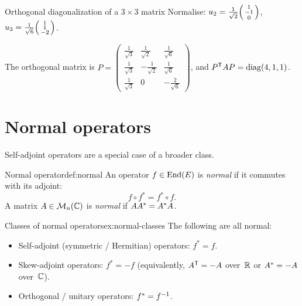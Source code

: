 \begin{example}{Orthogonal diagonalization of a $3\times 3$ matrix}
Normalise:
$u_2 = \frac{1}{\sqrt{2}}\begin{psmallmatrix}1\\-1\\0\end{psmallmatrix}$,
$u_3 = \frac{1}{\sqrt{6}}\begin{psmallmatrix}1\\1\\-2\end{psmallmatrix}$.

The orthogonal matrix is
$P = \begin{pmatrix}
\frac{1}{\sqrt{3}} & \frac{1}{\sqrt{2}} & \frac{1}{\sqrt{6}} \\[4pt]
\frac{1}{\sqrt{3}} & -\frac{1}{\sqrt{2}} & \frac{1}{\sqrt{6}} \\[4pt]
\frac{1}{\sqrt{3}} & 0 & -\frac{2}{\sqrt{6}}
\end{pmatrix}$,
and ${P}^{\mathsf{T}}AP = \operatorname{diag}(4,1,1)$.
\end{example}


\section{Normal operators}\label{sec:normal}

Self-adjoint operators are a special case of a broader class.

\begin{definition}{Normal operator}{def:normal}
An operator $f\in\operatorname{End}(E)$ is \emph{normal} if it commutes with its
adjoint:
\[
  f\circ f^* = f^*\circ f.
\]
A matrix $A\in\mathcal{M}_n({\mathbb{C}})$ is \emph{normal} if $A{A}^{*} = {A}^{*}A$.
\end{definition}

\begin{example}{Classes of normal operators}{ex:normal-classes}
The following are all normal:
\begin{itemize}
  \item Self-adjoint (symmetric / Hermitian) operators: $f^*=f$.
  \item Skew-adjoint operators: $f^*=-f$ (equivalently,
    ${A}^{\mathsf{T}}=-A$ over~${\mathbb{R}}$ or ${A}^{*}=-A$ over~${\mathbb{C}}$).
  \item Orthogonal / unitary operators: $f^*={f}^{-1}$.
\end{itemize}
\end{example}

